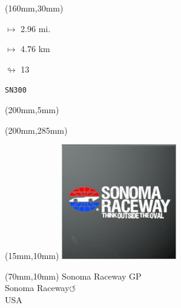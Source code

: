 \begin{textblock*}{40mm}(160mm,30mm)%
\Large
\par$\mapsto$ 2.96 mi.
\par$\mapsto$ 4.76 km
\par$\looparrowright$ 13
\par\hfill\tiny\tt SN300\\
\end{textblock*}
\begin{textblock*}{20mm}(200mm,5mm)%
\fbox{\thepage}
\label{SN300}
\end{textblock*}
\begin{textblock*}{20mm}(200mm,285mm)%
\fbox{\thepage}
\end{textblock*}

\null\newpage
\begin{textblock*}{50mm}(15mm,10mm)%
\includegraphics[width=50mm]{LG/2015-05-20_00096.png}
\end{textblock*}
\begin{textblock*}{130mm}(70mm,10mm)%
{\fontsize{20}{20}\selectfont Sonoma Raceway GP\\}
{\fontsize{16}{16}\selectfont Sonoma Raceway\hfill \huge$\circlearrowleft$\\}
{\fontsize{12}{12}\selectfont USA\\}
\end{textblock*}
